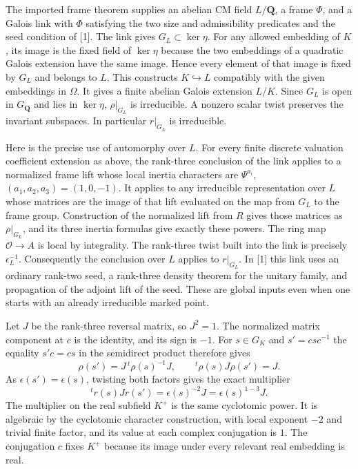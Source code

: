 The imported frame theorem supplies an abelian CM field $L/\mathbf Q$, a frame $\Phi$, and a Galois link with $\Phi$ satisfying the two size and admissibility predicates and the seed condition of [1]. The link gives $G_L\subset\ker\eta$. For any allowed embedding of $K$, its image is the fixed field of $\ker\eta$ because the two embeddings of a quadratic Galois extension have the same image. Hence every element of that image is fixed by $G_L$ and belongs to $L$. This constructs $K\hookrightarrow L$ compatibly with the given embeddings in $\Omega$. It gives a finite abelian Galois extension $L/K$. Since $G_L$ is open in $G_{\mathbf Q}$ and lies in $\ker\eta$, $\rho|_{G_L}$ is irreducible. A nonzero scalar twist preserves the invariant subspaces. In particular $r|_{G_L}$ is irreducible.

Here is the precise use of automorphy over $L$. For every finite discrete valuation coefficient extension as above, the rank-three conclusion of the link applies to a normalized frame lift whose local inertia characters are $\Psi^{a_i}$, $(a_1,a_2,a_3)=(1,0,-1)$. It applies to any irreducible representation over $L$ whose matrices are the image of that lift evaluated on the map from $G_L$ to the frame group. Construction of the normalized lift from $R$ gives those matrices as $\rho|_{G_L}$, and its three inertia formulas give exactly these powers. The ring map $\mathcal O\to A$ is local by integrality. The rank-three twist built into the link is precisely $\epsilon_L^{-1}$. Consequently the conclusion over $L$ applies to $r|_{G_L}$. In [1] this link uses an ordinary rank-two seed, a rank-three density theorem for the unitary family, and propagation of the adjoint lift of the seed. These are global inputs even when one starts with an already irreducible marked point.

Let $J$ be the rank-three reversal matrix, so $J^2=1$. The normalized matrix component at $c$ is the identity, and its sign is $-1$. For $s\in G_K$ and $s'=csc^{-1}$ the equality $s'c=cs$ in the semidirect product therefore gives
\[
             \rho(s')=J\,{}^t\!\rho(s)^{-1}J,\qquad
             {}^t\!\rho(s)J\rho(s')=J .
\]
As $\epsilon(s')=\epsilon(s)$, twisting both factors gives the exact multiplier
\begin{equation}
 {}^t\!r(s)Jr(s')=\epsilon(s)^{-2}J
                 =\epsilon(s)^{1-3}J.                  \label{eq:ord-descent-pair}
\end{equation}
The multiplier on the real subfield $K^+$ is the same cyclotomic power. It is algebraic by the cyclotomic character construction, with local exponent $-2$ and trivial finite factor, and its value at each complex conjugation is $1$. The conjugation $c$ fixes $K^+$ because its image under every relevant real embedding is real.

